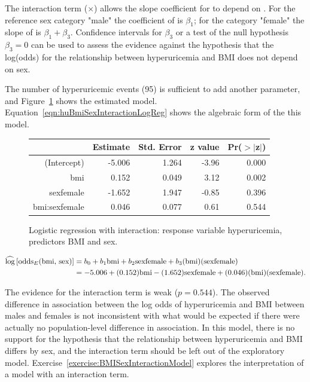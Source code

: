 The interaction term ($\times$) allows the slope coefficient for  to depend on .  For the reference sex category "male" the coefficient of  is $\beta_1$; for the category "female" the slope of  is $\beta_1 + \beta_3$.  Confidence intervals for $\beta_3$ or a test of the null hypothesis $\beta_3 = 0$ can be used to assess the evidence against the hypothesis that the log(odds) for the relationship between hyperuricemia and BMI does not depend on sex.

The number of hyperuricemic events (95) is sufficient to add another parameter, and  Figure~\ref{figure:huBmiSexInteractionLogReg} shows the estimated model.  Equation~\ref{eqn:huBmiSexInteractionLogReg} shows the algebraic form of the this model.

\begin{figure}[ht]
\centering
\begin{tabular}{rrrrr}
  \hline
 & Estimate & Std. Error & z value & Pr($>$$|$z$|$) \\
  \hline
(Intercept) & -5.006 & 1.264 & -3.96 & 0.000 \\
  bmi & 0.152 & 0.049 & 3.12 & 0.002 \\
  sexfemale & -1.652 & 1.947 & -0.85 & 0.396 \\
  bmi:sexfemale & 0.046 & 0.077 & 0.61 & 0.544 \\
   \hline
\end{tabular}
\caption{Logistic regression with interaction: response variable hyperuricemia,
        predictors BMI and sex.}
\label{figure:huBmiSexInteractionLogReg}
\end{figure}

\begin{align}
  \widehat{\log}\left[\text{odds}_E(\text{bmi, sex})\right] &= b_0 + b_1\text{bmi}
  + b_2\text{sexfemale} + b_3\text{(bmi)(sexfemale)} \notag \\
  &= -5.006 + (0.152)\text{bmi}
  -(1.652)\text{sexfemale} + (0.046)\text{(bmi)(sexfemale)}.
  \label{eqn:huBmiSexInteractionLogReg}
\end{align}


The evidence for the interaction term is weak ($p = 0.544$). The observed difference in association between the log odds of hyperuricemia and BMI between males and females is not inconsistent with what would be expected if there were actually no population-level difference in association. In this model, there is no support for the hypothesis that the relationship between hyperuricemia and BMI differs by sex, and the interaction term should be left out of the exploratory model. Exercise~\ref{exercise:BMISexInteractionModel} explores the interpretation of a model with an interaction term.

